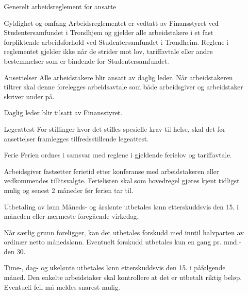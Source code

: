 \begin{lovkapittel}{Generelt arbeidsreglement for ansatte}


    \begin{lovparagraf}{Gyldighet og omfang}
        Arbeidsreglementet er vedtatt av Finansstyret ved Studentersamfundet i Trondhjem og gjelder alle arbeidstakere i et
        fast forpliktende arbeidsforhold ved Studentersamfundet i Trondheim.
        Reglene i reglementet gjelder ikke når de strider mot lov, tariffavtale eller andre bestemmelser som er bindende for
        Studentersamfundet.
    \end{lovparagraf}

    \begin{lovparagraf}{Ansettelser}
        Alle arbeidstakere blir ansatt av daglig leder. Når arbeidstakeren tiltrer skal denne forelegges arbeidsavtale som både
        arbeidsgiver og arbeidstaker skriver under på.

        Daglig leder blir tilsatt av Finansstyret.
    \end{lovparagraf}

    \begin{lovparagraf}{Legeattest}
        For stillinger hvor det stilles spesielle krav til helse, skal det før ansettelser framlegges tilfredsstillende legeattest.
    \end{lovparagraf}

    \begin{lovparagraf}{Ferie}
        Ferien ordnes i samsvar med reglene i gjeldende ferielov og tariffavtale.

        Arbeidsgiver fastsetter ferietid etter konferanse med arbeidstakeren eller vedkommendes tillitsvalgte. Ferielisten skal
        som hovedregel gjøres kjent tidligst mulig og senest 2 måneder før ferien tar til.
    \end{lovparagraf}

    \begin{lovparagraf}{Utbetaling av lønn}
        Måneds- og årslønte utbetales lønn etterskuddsvis den 15. i måneden eller nærmeste foregående virkedag.

        Når særlig grunn foreligger, kan det utbetales forskudd med inntil halvparten av ordinær netto månedslønn. Eventuelt
        forskudd utbetales kun en gang pr. mnd.- den 30.

        Time-, dag- og ukelønte utbetales lønn etterskuddsvis den 15. i påfølgende måned. Den enkelte arbeidstaker skal kontrollere at det er utbetalt riktig beløp. Eventuell feil må meldes snarest mulig.


\end{lovparagraf}
\end{lovkapittel}
